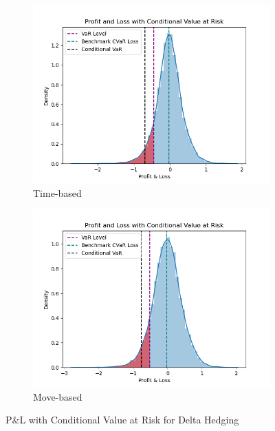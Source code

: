 \documentclass[12pt]{article}
\begin{document}
\begin{figure}[H]
  \centering
  \begin{subfigure}{.5\textwidth}
    \centering
    \includegraphics[width=\linewidth]{delta-var-t.png}
    \caption{Time-based}
  \end{subfigure}%
  \begin{subfigure}{.5\textwidth}
    \centering
    \includegraphics[width=\linewidth]{delta-var-m.png}
    \caption{Move-based}
  \end{subfigure}%
  \caption{P\&L with Conditional Value at Risk for Delta Hedging}
\end{figure}
\end{document}

